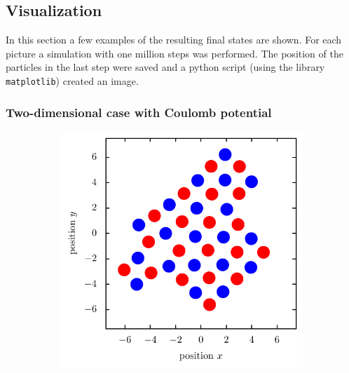 \documentclass[11pt, a4paper]{article}
\numberwithin{equation}{section}
\begin{document}
\subsection{Visualization} \label{sec:Visualisation}
In this section a few examples of the resulting final states are shown.
For each picture a simulation with one million steps was performed.
The position of the particles in the last step were saved and a python script (using the library \texttt{matplotlib}) created an image.

\subsubsection{Two-dimensional case with Coulomb potential} \label{sec:2d_coulomb_vis}

\begin{figure}[p]
	\begin{subfigure}[t]{0.48\textwidth}
		\centering
		\includegraphics[width=\textwidth]{figures/Kristall_3_beta_500.pdf}
	\end{subfigure}

\end{figure}
\end{document}
